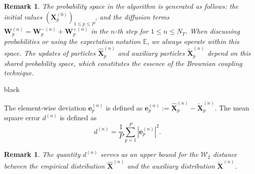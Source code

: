 \documentclass[review,onefignum,onetabnum]{siamart250211}
\newtheorem{remark}[theorem]{Remark}
\begin{document}
\begin{remark}
\label{def_random_space}
The probability space in the algorithm is generated as follows: the initial values \((\mathbf{X}_p^{(0)})_{1 \leq p \leq P} \), and the diffusion terms \( \mathbf{W}_p^{(n)}=\mathbf{W}_p^{-(n)}+\mathbf{W}_p^{+(n)} \) in the \( n \)-th step for \( 1 \leq n \leq N_T \). When discussing probabilities or using the expectation notation $\mathbb{E}$, we always operate within this space. The updates of particles $\widehat{\mathbf{X}}_p^{(n)}$ and auxiliary particles $\widetilde{\mathbf{X}}_p^{(n)}$ depend on this shared probability space, which constitutes the essence of the Brownian coupling technique.
\end{remark}
\begin{color}{black}
\begin{definition}
\label{def:mean_abs_error}
The element-wise deviation \(\mathbf{e}_p^{(n)}\) is defined as $\mathbf{e}_p^{(n)} := \widehat{\mathbf{X}}_p^{(n)} - \widetilde{\mathbf{X}}_p^{(n)}$. The mean square error \( d^{(n)} \) is defined as 
\begin{equation}
\label{eq:avg_distance}
d^{(n)} = \frac{1}{P} \sum\limits_{p=1}^{P} |\mathbf{e}_p^{(n)}|^2.
\end{equation}
\end{definition}

\begin{remark}
The quantity \( d^{(n)} \) serves as an upper bound for the \( \mathcal{W}_2 \) distance between the empirical distribution \( \widehat{\mathbf{X}}^{(n)} \) and the auxiliary distribution \( \widetilde{\mathbf{X}}^{(n)} \).
\end{remark}
\end{color}
\end{document}
